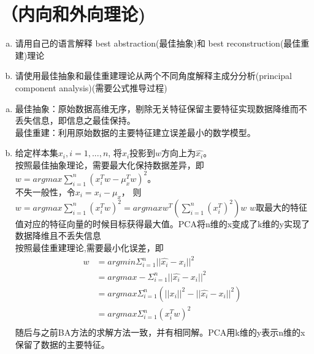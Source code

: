 \documentclass[11pt]{article}
\newenvironment{answer}{\par\color{MidnightBlue}}{\par}
\begin{document}
\section{（内向和外向理论)}
\begin{enumerate}[(a)]
    \item 请用自己的语言解释 best abstraction(最佳抽象)和 best	reconstruction(最佳重建)理论
    \item 请使用最佳抽象和最佳重建理论从两个不同角度解释主成分分析(principal component analysis)(需要公式推导过程)
\end{enumerate}
\begin{answer}
\begin{enumerate}[(a)]
    \item 最佳抽象：原始数据高维无序，剔除无关特征保留主要特征实现数据降维而不丢失信息，即信息之最佳保持。\\
最佳重建：利用原始数据的主要特征建立误差最小的数学模型。
    \item 给定样本集${x_i}, i = 1,..., n$, 将$x_i$投影到$w$方向上为$\hat{x_i}$。\\
    按照最佳抽象理论，需要最大化保持数据差异，即$w=arg max\sum_{i=1}^n(x_i^Tw - \mu_x^Tw)^2$。\\
    不失一般性，令$x_i=x_i-\mu_x$，
    则$w=arg max\sum_{i=1}^n(x_i^Tw)^2 = arg max w^T\left(\sum_{i=1}^n(x_i^T)^2\right)w$
    $w$取最大的特征值对应的特征向量的时候目标获得最大值。PCA将n维的x变成了k维的y实现了数据降维且不丢失信息\\

    按照最佳重建理论,需要最小化误差，即\begin{align*}
      w &= arg min\Sigma_{i=1}^n||\hat{x_i}-x_i||^2 \\
        &= arg max - \Sigma_{i=1}^n||\hat{x_i}-x_i||^2 \\
        &= arg max \Sigma_{i=1}^n\left(||x_i||^2 - ||\hat{x_i}-x_i||^2 \right)\\
        &= arg max \Sigma_{i=1}^n(x_i^Tw)^2 \\
    \end{align*}
    随后与之前BA方法的求解方法一致，并有相同解。PCA用k维的y表示n维的x保留了数据的主要特征。
\end{enumerate}
\end{answer}
\end{document}
